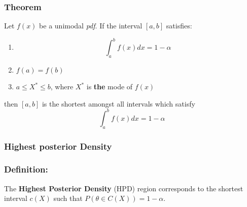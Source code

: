 \documentclass{article}
\begin{document}
\subsubsection*{Theorem}
Let $f(x)$ be a unimodal \textit{pdf}. If the interval $[a,b]$ satisfies:
\begin{enumerate}
    \item \begin{equation*}
        \int_a^b f(x) dx = 1-\alpha
    \end{equation*}
    
    \item $f(a) = f(b)$
    
    \item $a\leq X^* \leq b$, where $X^*$ is \textbf{the} mode of $f(x)$
\end{enumerate}
then $[a,b]$ is the shortest amongst all intervals which satisfy
\begin{equation*}
    \int_a^b f(x) dx = 1-\alpha
\end{equation*}

\subsubsection{Highest posterior Density}
\subsubsection*{Definition:}

The \textbf{Highest Posterior Density} (HPD) region corresponds to the shortest interval $c(X)$ such that $P(\theta \in C(X)) = 1 - \alpha$.
\end{document}

